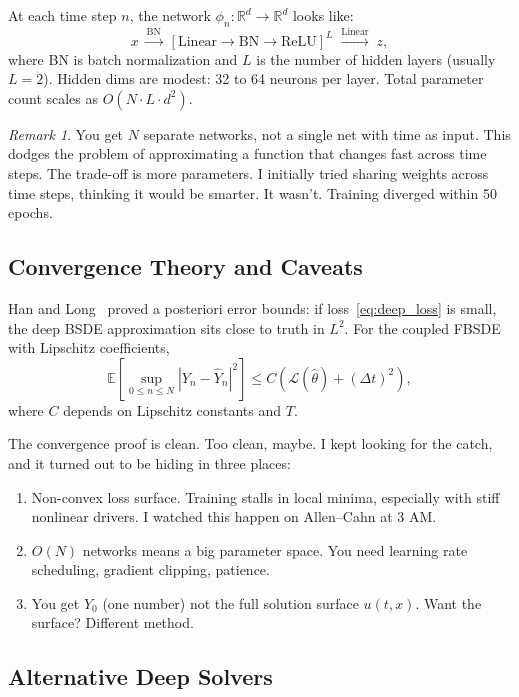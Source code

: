 \documentclass[11pt]{article}
\theoremstyle{definition}
\theoremstyle{remark}
\newtheorem{remark}[theorem]{Remark}
\newcommand{\R}{\mathbb{R}}
\newcommand{\E}{\mathbb{E}}
\begin{document}
At each time step $n$, the network $\phi_n \colon \R^d \to \R^d$ looks like:
\[
  x \;\xrightarrow{\text{BN}}\;
  [\text{Linear} \to \text{BN} \to \text{ReLU}]^L
  \;\xrightarrow{\text{Linear}}\; z,
\]
where BN is batch normalization and $L$ is the number of hidden layers
(usually $L = 2$). Hidden dims are modest: 32 to 64 neurons per layer.
Total parameter count scales as $O(N \cdot L \cdot d^2)$.

\begin{remark}
You get $N$ separate networks, not a single net with time as input.
This dodges the problem of approximating a function that changes fast
across time steps. The trade-off is more parameters. I initially tried
sharing weights across time steps, thinking it would be
smarter. It wasn't. Training diverged within 50 epochs.
\end{remark}

\subsection{Convergence Theory and Caveats}

Han and Long~\cite{hanlong2020convergence} proved a posteriori error
bounds: if loss~\eqref{eq:deep_loss} is small, the deep BSDE
approximation sits close to truth in $L^2$. For the coupled FBSDE
with Lipschitz coefficients,
\[
  \E\!\left[\sup_{0 \le n \le N} |Y_n - \hat{Y}_n|^2\right]
  \le C \left(\mathcal{L}(\hat{\theta}) + (\Delta t)^2\right),
\]
where $C$ depends on Lipschitz constants and $T$.

The convergence proof is clean. Too clean, maybe. I kept looking for the catch,
and it turned out to be hiding in three places:
\begin{enumerate}[label=(\roman*)]
  \item Non-convex loss surface. Training stalls in local minima,
  especially with stiff nonlinear drivers. I watched this happen on
  Allen--Cahn at 3 AM.
  \item $O(N)$ networks means a big parameter space. You need learning
  rate scheduling, gradient clipping, patience.
  \item You get $Y_0$ (one number) not the full solution surface
  $u(t,x)$. Want the surface? Different method.
\end{enumerate}

\subsection{Alternative Deep Solvers}
\end{document}
